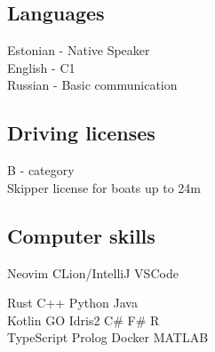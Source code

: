 \documentclass[letterpaper]{deedy-resume} %
\begin{document}
\begin{minipage}[t]{0.33\textwidth}
\subsection{Languages}

Estonian - Native Speaker \\
English - C1 \\
Russian - Basic communication \\

\sectionspace %


\subsection{Driving licenses}

B - category \\
Skipper license for boats up to 24m \\

\sectionspace %

\subsection{Computer skills}

Neovim \textbullet{} CLion/IntelliJ \textbullet{} VSCode \\

\sectionspace

Rust \textbullet{} C++ \textbullet{} Python \textbullet{} Java \\
Kotlin \textbullet{} GO \textbullet{} Idris2 \textbullet{} C\# \textbullet{} F\# \textbullet{} R \\
TypeScript \textbullet{} Prolog \textbullet{} Docker \textbullet{} MATLAB


\sectionspace %


\end{minipage} %
\hfill
%
%
\end{document}
